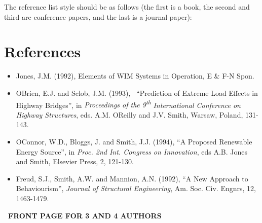 \documentclass[a4paper]{article}
\newcommand\liststyleWWNumvi{%
\renewcommand\theenumi{\arabic{enumi}}
\renewcommand\theenumii{\arabic{enumii}}
\renewcommand\theenumiii{\arabic{enumiii}}
\renewcommand\labelitemi{[F0B7?]}
\renewcommand\labelenumi{\theenumi.}
\renewcommand\labelenumii{\theenumii.}
\renewcommand\labelenumiii{\theenumiii.}
}
\begin{document}
\bigskip

{
The reference list style should be as follows (the first is a book, the
second and third are conference papers, and the last is a journal
paper):}

\section{References}
\liststyleWWNumvi
\begin{itemize}
\item {
Jones, J.M. (1992), Elements of WIM Systems in Operation, E \& F-N
Spon.}
\item {
O{\textquotesingle}Brien, E.J. and Sclob, J.M. (1993), \ “Prediction of
Extreme Load Effects in Highway Bridges”, in \textit{Proceedings of the
9}\textit{\textsuperscript{th}}\textit{ International Conference on
Highway Structures}, eds. A.M. O{\textquotesingle}Reilly and J.V.
Smith, Warsaw, Poland, 131-143.}
\item {
O{\textquotesingle}Connor, W.D., Bloggs, J. and Smith, J.J. (1994), “A
Proposed Renewable Energy Source”, in \textit{Proc. 2nd Int. Congress
on Innovation}, eds A.B. Jones and Smith, Elsevier Press, 2, 121-130.}
\item {
Freud, S.J., Smith, A.W. and Mannion, A.N. (1992), “A New Approach to
Behaviourism”, \textit{Journal of Structural Engineering}, Am. Soc.
Civ. Engnrs, 12, 1463-1479.}
\end{itemize}
{\centering{}\bfseries
\ FRONT PAGE FOR 3 AND 4 AUTHORS
\par}


\bigskip
\end{document}
